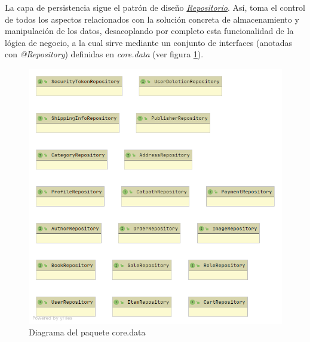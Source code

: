 \documentclass[a4paper,12pt,twoside,openright]{report}
\begin{document}
   	La capa de persistencia sigue el patrón de diseño \href{https://thorben-janssen.com/implementing-the-repository-pattern-with-jpa-and-hibernate/}{\emph{Repositorio}}. Así, toma el control de todos los aspectos relacionados con la solución concreta de almacenamiento y manipulación de los datos, desacoplando por completo esta funcionalidad de la lógica de negocio, a la cual sirve mediante un conjunto de interfaces (anotadas con \emph{@Repository}) definidas en \emph{core.data} (ver figura \ref{fig:package_data}).
    	
   	\begin{figure}[htb!]
   		\centering
   		\includegraphics[width=\textwidth,keepaspectratio]{package_data}
   		\caption{Diagrama del paquete core.data}
   		\label{fig:package_data}
   	\end{figure}
   	
\end{document}
